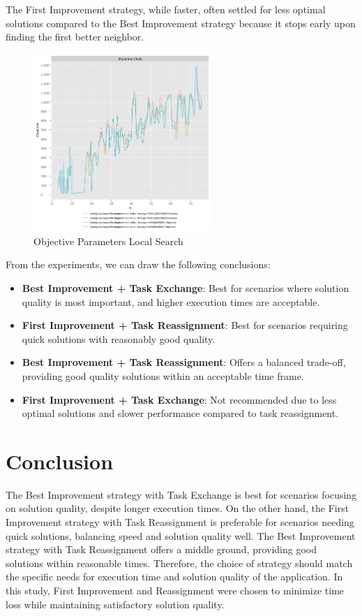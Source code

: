 \documentclass{article}
\begin{document}
The First Improvement strategy, while faster, often settled for less optimal solutions compared to the Best Improvement strategy because it stops early upon finding the first better neighbor.

\begin{figure}[!h]
    \centering
    \includegraphics[width=0.6\textwidth]{./documentation/assets/new.localSearchParams.objectiveChart.pdf}
    \caption{Objective Parameters Local Search}
    \label{fig:local_objective}
\end{figure}\FloatBarrier

From the experiments, we can draw the following conclusions:
\begin{itemize}
    \item \textbf{Best Improvement + Task Exchange}: Best for scenarios where solution quality is most important, and higher execution times are acceptable.
    \item \textbf{First Improvement + Task Reassignment}: Best for scenarios requiring quick solutions with reasonably good quality.
    \item \textbf{Best Improvement + Task Reassignment}: Offers a balanced trade-off, providing good quality solutions within an acceptable time frame.
    \item \textbf{First Improvement + Task Exchange}: Not recommended due to less optimal solutions and slower performance compared to task reassignment.
\end{itemize}

\section*{Conclusion}
The Best Improvement strategy with Task Exchange is best for scenarios focusing on solution quality, despite longer execution times. On the other hand, the First Improvement strategy with Task Reassignment is preferable for scenarios needing quick solutions, balancing speed and solution quality well. The Best Improvement strategy with Task Reassignment offers a middle ground, providing good solutions within reasonable times. Therefore, the choice of strategy should match the specific needs for execution time and solution quality of the application. In this study, First Improvement and Reassignment were chosen to minimize time loss while maintaining satisfactory solution quality.
\end{document}
